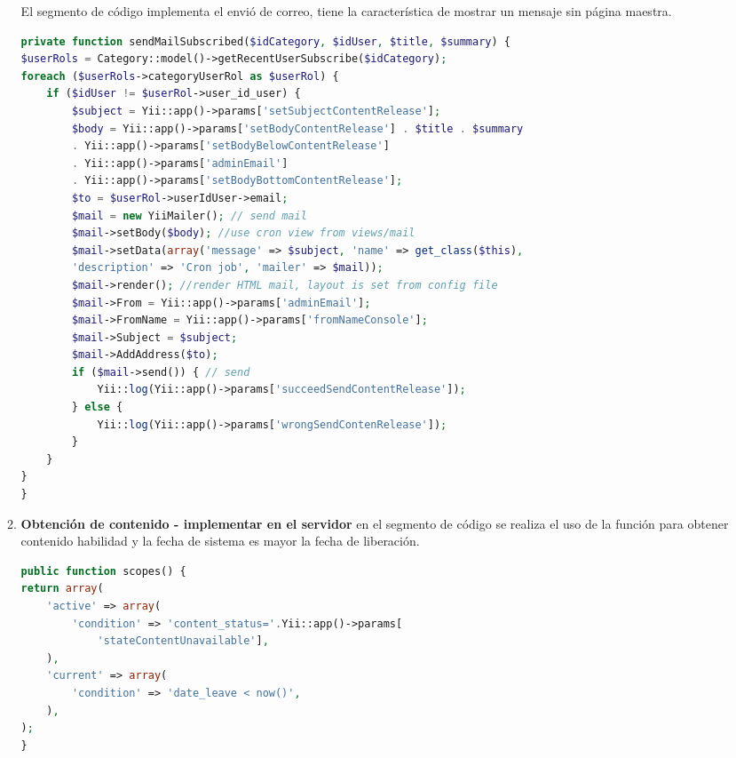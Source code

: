 \begin{itemize}
\begin{enumerate}
El segmento de código implementa el envió de correo, tiene la característica
de mostrar un mensaje sin página maestra.

\begin{lstlisting}[language=PHP, caption={Envió de mensaje sin  contenedor de página.}]
private function sendMailSubscribed($idCategory, $idUser, $title, $summary) {
$userRols = Category::model()->getRecentUserSubscribe($idCategory);
foreach ($userRols->categoryUserRol as $userRol) {
    if ($idUser != $userRol->user_id_user) {
        $subject = Yii::app()->params['setSubjectContentRelease'];
        $body = Yii::app()->params['setBodyContentRelease'] . $title . $summary
        . Yii::app()->params['setBodyBelowContentRelease'] 
        . Yii::app()->params['adminEmail']
        . Yii::app()->params['setBodyBottomContentRelease'];
        $to = $userRol->userIdUser->email;
        $mail = new YiiMailer(); // send mail
        $mail->setBody($body); //use cron view from views/mail
        $mail->setData(array('message' => $subject, 'name' => get_class($this), 
        'description' => 'Cron job', 'mailer' => $mail));
        $mail->render(); //render HTML mail, layout is set from config file
        $mail->From = Yii::app()->params['adminEmail'];
        $mail->FromName = Yii::app()->params['fromNameConsole'];
        $mail->Subject = $subject;
        $mail->AddAddress($to);
        if ($mail->send()) { // send
            Yii::log(Yii::app()->params['succeedSendContentRelease']); 
        } else {
            Yii::log(Yii::app()->params['wrongSendContenRelease']);
        }
    }
}
}
\end{lstlisting}

\item \textbf{Obtención de contenido - implementar en el servidor}
en el segmento de código se realiza el uso de la función 
para obtener contenido habilidad y la fecha de sistema es mayor la fecha
de liberación.

\begin{lstlisting}[language=PHP, caption={Obtención de contenido para liberar podcast.}]
public function scopes() {
return array(
    'active' => array(
        'condition' => 'content_status='.Yii::app()->params[
            'stateContentUnavailable'],
    ),
    'current' => array(
        'condition' => 'date_leave < now()',
    ),
);
}
\end{lstlisting}

\end{enumerate}

\end{itemize}

